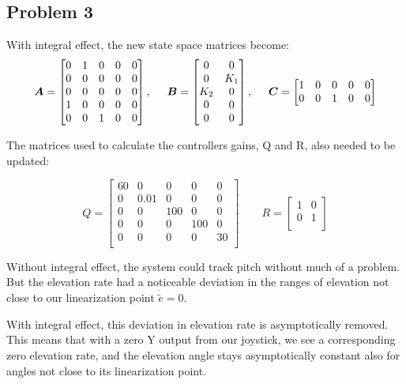 \subsection{Problem 3}
With integral effect, the new state space matrices become:
\begin{equation}
  \boldsymbol{A} = \begin{bmatrix}
    0 & 1 & 0 & 0 & 0\\
    0 & 0 & 0 & 0 & 0\\
    0 & 0 & 0 & 0 & 0\\
    1 & 0 & 0 & 0 & 0\\
    0 & 0 & 1 & 0 & 0\\
  \end{bmatrix}, \hspace{0.5cm}
  \boldsymbol{B} = \begin{bmatrix}
    0 & 0 \\
    0 & K_1 \\
    K_2 & 0 \\
    0 & 0 \\
    0 & 0 \\
  \end{bmatrix}, \hspace{0.5cm}
  \boldsymbol{C} = \begin{bmatrix}
    1 & 0 & 0 & 0 & 0\\
    0 & 0 & 1 & 0 & 0\\
  \end{bmatrix}
\end{equation}

The matrices used to calculate the controllers gains, Q and R, also needed to be updated:

\begin{equation}
  Q =
  \begin{bmatrix}
    60 & 0   & 0  & 0 & 0 \\
    0  & 0.01 & 0  & 0 & 0 \\
    0  & 0   & 100 & 0 & 0 \\
    0  & 0   & 0  & 100 & 0 \\
    0  & 0   & 0  & 0 & 30 \\
  \end{bmatrix}
  \qquad
  R =
  \begin{bmatrix}
    1 & 0 \\
    0 & 1 \\
  \end{bmatrix}
\end{equation}

Without integral effect, the system could track pitch without much of
a problem. But the elevation rate had a noticeable deviation in the
ranges of elevation not close to our linearization point
$\dot{\tilde{e}} = 0$.

With integral effect, this deviation in elevation rate is
asymptotically removed. This means that with a zero Y output from our
joystick, we see a corresponding zero elevation rate, and the
elevation angle stays asymptotically constant also for angles not
close to its linearization point.
